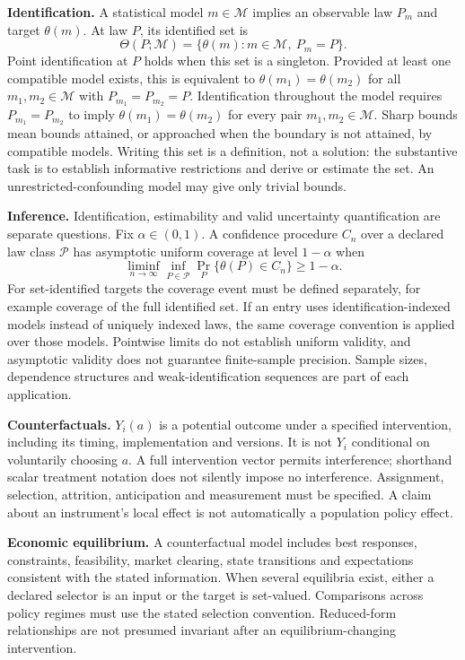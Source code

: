 \documentclass[11pt,a4paper]{article}
\begin{document}
\textbf{Identification.} A statistical model $m\in\mathcal M$ implies an observable law $P_m$ and target $\theta(m)$. At law $P$, its identified set is
\[
\Theta(P;\mathcal M)=\{\theta(m):m\in\mathcal M,\ P_m=P\}.
\]
Point identification at $P$ holds when this set is a singleton. Provided at least one compatible model exists, this is equivalent to $\theta(m_1)=\theta(m_2)$ for all $m_1,m_2\in\mathcal M$ with $P_{m_1}=P_{m_2}=P$. Identification throughout the model requires $P_{m_1}=P_{m_2}$ to imply $\theta(m_1)=\theta(m_2)$ for every pair $m_1,m_2\in\mathcal M$. Sharp bounds mean bounds attained, or approached when the boundary is not attained, by compatible models. Writing this set is a definition, not a solution: the substantive task is to establish informative restrictions and derive or estimate the set. An unrestricted-confounding model may give only trivial bounds.

\textbf{Inference.} Identification, estimability and valid uncertainty quantification are separate questions. Fix $\alpha\in(0,1)$. A confidence procedure $C_n$ over a declared law class $\mathcal P$ has asymptotic uniform coverage at level $1-\alpha$ when
\[
\liminf_{n\to\infty}\inf_{P\in\mathcal P}\Pr_P\{\theta(P)\in C_n\}\geq1-\alpha.
\]
For set-identified targets the coverage event must be defined separately, for example coverage of the full identified set. If an entry uses identification-indexed models instead of uniquely indexed laws, the same coverage convention is applied over those models. Pointwise limits do not establish uniform validity, and asymptotic validity does not guarantee finite-sample precision. Sample sizes, dependence structures and weak-identification sequences are part of each application.

\textbf{Counterfactuals.} $Y_i(a)$ is a potential outcome under a specified intervention, including its timing, implementation and versions. It is not $Y_i$ conditional on voluntarily choosing $a$. A full intervention vector permits interference; shorthand scalar treatment notation does not silently impose no interference. Assignment, selection, attrition, anticipation and measurement must be specified. A claim about an instrument's local effect is not automatically a population policy effect.

\textbf{Economic equilibrium.} A counterfactual model includes best responses, constraints, feasibility, market clearing, state transitions and expectations consistent with the stated information. When several equilibria exist, either a declared selector is an input or the target is set-valued. Comparisons across policy regimes must use the stated selection convention. Reduced-form relationships are not presumed invariant after an equilibrium-changing intervention.
\end{document}
